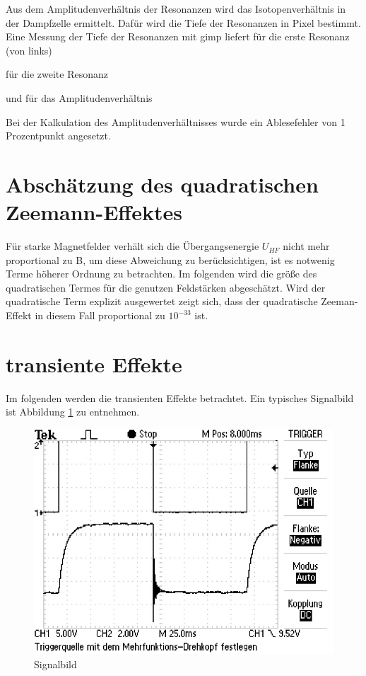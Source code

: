 Aus dem Amplitudenverhältnis der Resonanzen wird das Isotopenverhältnis in der
Dampfzelle ermittelt. Dafür wird die Tiefe der Resonanzen in Pixel bestimmt.
Eine Messung der Tiefe der Resonanzen mit gimp liefert für die erste Resonanz (von links)



für die zweite Resonanz



und für das Amplitudenverhältnis



Bei der Kalkulation des Amplitudenverhältnisses wurde ein Ablesefehler von 1 Prozentpunkt
angesetzt.

\section{Abschätzung des quadratischen Zeemann-Effektes}
Für starke Magnetfelder verhält sich die Übergangsenergie $U_{HF}$ nicht mehr proportional zu B, um diese Abweichung zu berücksichtigen, ist es notwenig Terme höherer Ordnung zu betrachten.
Im folgenden wird die größe des quadratischen Termes für die genutzen Feldstärken abgeschätzt. Wird der quadratische Term explizit ausgewertet zeigt sich, dass der quadratische Zeeman-Effekt
in diesem Fall proportional zu $10^{-33}$ ist.

\section{transiente Effekte}
Im folgenden werden die transienten Effekte betrachtet. Ein typisches Signalbild ist Abbildung \ref{sigPic} zu entnehmen.

\begin{figure}[H]
\centering
\includegraphics[scale=0.8]{./optischesPumpen/img/TEK0019.JPG}
\caption{Signalbild}
\label{sigPic}
\end{figure}

